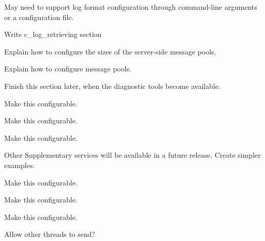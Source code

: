 \begin{DoxyRefList}
May need to support log format configuration through command-\/line arguments or a configuration file.

Write c\+\_\+log\+\_\+retrieving section 
\item[\label{todo__todo000027}%
\hypertarget{todo__todo000027}{}%
Page \hyperlink{c_messaging}{Low-\/level Messaging A\+PI} ]Explain how to configure the sizes of the server-\/side message pools.

Explain how to configure message pools.

Finish this section later, when the diagnostic tools become available. 
\item[\label{todo__todo000003}%
\hypertarget{todo__todo000003}{}%
Global \hyperlink{log_daemon_8c_a12e0e31daedad0866a49a35dfa357a40}{M\+A\+X\+\_\+\+E\+X\+P\+E\+C\+T\+E\+D\+\_\+\+C\+O\+M\+P\+O\+N\+E\+N\+TS} ]Make this configurable.  
\item[\label{todo__todo000002}%
\hypertarget{todo__todo000002}{}%
Global \hyperlink{log_daemon_8c_a10a106cd691842a6a5accbef3cf7774f}{M\+A\+X\+\_\+\+E\+X\+P\+E\+C\+T\+E\+D\+\_\+\+P\+R\+O\+C\+E\+S\+S\+ES} ]Make this configurable.  
\item[\label{todo__todo000004}%
\hypertarget{todo__todo000004}{}%
Global \hyperlink{log_daemon_8c_a895920e1e0172dc9ad130012b1fb3aa1}{M\+A\+X\+\_\+\+E\+X\+P\+E\+C\+T\+E\+D\+\_\+\+T\+R\+A\+C\+ES} ]Make this configurable.  
\item[\label{todo__todo000063}%
\hypertarget{todo__todo000063}{}%
Page \hyperlink{c_mcc}{Modem Call Control} ]Other Supplementary services will be available in a future release. Create simpler examples. 
\item[\label{todo__todo000046}%
\hypertarget{todo__todo000046}{}%
Global \hyperlink{messaging_message_8h_a7cfc6f2fb2e30652542d896f83f8f2c9}{msg\+Message\+\_\+\+Create\+Pool} (const char $\ast$name, size\+\_\+t largest\+Msg\+Size)]Make this configurable.  
\item[\label{todo__todo000047}%
\hypertarget{todo__todo000047}{}%
Global \hyperlink{messaging_protocol_8h_a136d85843f446d9a787590679b8e0ad8}{msg\+Proto\+\_\+\+Init} (void)]Make this configurable.  
\item[\label{todo__todo000048}%
\hypertarget{todo__todo000048}{}%
Global \hyperlink{messaging_session_8h_ab4c031a82b80e4191b18f78c37ccb9ae}{msg\+Session\+\_\+\+Init} (void)]Make this configurable.  
\item[\label{todo__todo000050}%
\hypertarget{todo__todo000050}{}%
Global \hyperlink{messaging_session_8h_a76ceaaa7dff5e86dc363afdf73f4ef02}{msg\+Session\+\_\+\+Request\+Response} (le\+\_\+msg\+\_\+\+Session\+Ref\+\_\+t session\+Ref, le\+\_\+msg\+\_\+\+Message\+Ref\+\_\+t msg\+Ref)]Allow other threads to send?  

\end{DoxyRefList}
